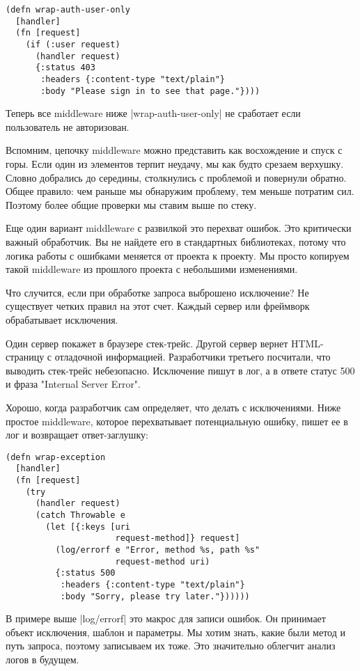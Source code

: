 \begin{verbatim}
(defn wrap-auth-user-only
  [handler]
  (fn [request]
    (if (:user request)
      (handler request)
      {:status 403
       :headers {:content-type "text/plain"}
       :body "Please sign in to see that page."})))
\end{verbatim}

Теперь все middleware ниже \spverb|wrap-auth-user-only| не сработает если пользователь
не авторизован.

Вспомним, цепочку middleware можно представить как восхождение и спуск с
горы. Если один из элементов терпит неудачу, мы как будто срезаем
верхушку. Словно добрались до середины, столкнулись с проблемой и повернули
обратно. Общее правило: чем раньше мы обнаружим проблему, тем меньше потратим
сил. Поэтому более общие проверки мы ставим выше по стеку.

Еще один вариант middleware с развилкой это перехват ошибок. Это критически
важный обработчик. Вы не найдете его в стандартных библиотеках, потому что
логика работы с ошибками меняется от проекта к проекту. Мы просто копируем такой
middleware из прошлого проекта с небольшими изменениями.

Что случится, если при обработке запроса выброшено исключение? Не существует
четких правил на этот счет. Каждый сервер или фреймворк обрабатывает исключения.

Один сервер покажет в браузере стек-трейс. Другой сервер вернет HTML-страницу с
отладочной информацией. Разработчики третьего посчитали, что выводить стек-трейс
небезопасно. Исключение пишут в лог, а в ответе статус 500 и фраза "Internal
Server Error".

Хорошо, когда разработчик сам определяет, что делать с исключениями. Ниже
простое middleware, которое перехватывает потенциальную ошибку, пишет ее в лог и
возвращает ответ-заглушку:

\begin{verbatim}
(defn wrap-exception
  [handler]
  (fn [request]
    (try
      (handler request)
      (catch Throwable e
        (let [{:keys [uri
                      request-method]} request]
          (log/errorf e "Error, method %s, path %s"
                      request-method uri)
          {:status 500
           :headers {:content-type "text/plain"}
           :body "Sorry, please try later."})))))
\end{verbatim}

В примере выше \spverb|log/errorf| это макрос для записи ошибок. Он принимает объект
исключения, шаблон и параметры. Мы хотим знать, какие были метод и путь запроса,
поэтому записываем их тоже. Это значительно облегчит анализ логов в будущем.

